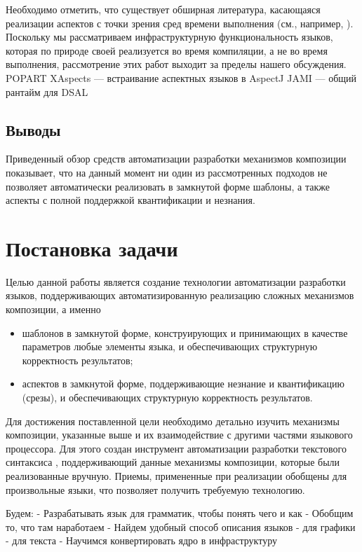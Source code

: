Необходимо отметить, что существует обширная литература, касающаяся реализации аспектов с точки зрения сред времени выполнения (см., например, \cite{???-???}). Поскольку мы рассматриваем инфраструктурную функциональность языков, которая по природе своей реализуется во время компиляции, а не во время выполнения, рассмотрение этих работ выходит за пределы нашего обсуждения.
	POPART
	XAspects --- встраивание аспектных языков в AspectJ	
	JAMI --- общий рантайм для DSAL
	
\section{Выводы}

Приведенный обзор средств автоматизации разработки механизмов композиции показывает, что на данный момент ни один из рассмотренных подходов не позволяет автоматически реализовать в замкнутой форме шаблоны, а также аспекты с полной поддержкой квантификации и незнания.

\chapter{Постановка задачи}

Целью данной работы является создание технологии автоматизации разработки языков, поддерживающих автоматизированную реализацию сложных механизмов композиции, а именно
\begin{itemize}
\item шаблонов в замкнутой форме, конструирующих и принимающих в качестве параметров любые элементы языка, и обеспечивающих структурную корректность результатов;
\item аспектов в замкнутой форме, поддерживающие незнание и квантификацию (срезы), и обеспечивающих структурную корректность результатов.
\end{itemize}

Для достижения поставленной цели необходимо детально изучить механизмы композиции, указанные выше и их взаимодействие с другими частями языкового процессора. Для этого создан инструмент автоматизации разработки текстового синтаксиса , поддерживающий данные механизмы композиции, которые были реализованные вручную. Приемы, примененные при реализации  обобщены для произвольные языки, что позволяет получить требуемую технологию.

Будем:
	- Разрабатывать язык для грамматик, чтобы понять чего и как
	- Обобщим то, что там наработаем
	- Найдем удобный способ описания языков
		- для графики
		- для текста
	- Научимся конвертировать ядро в инфраструктуру